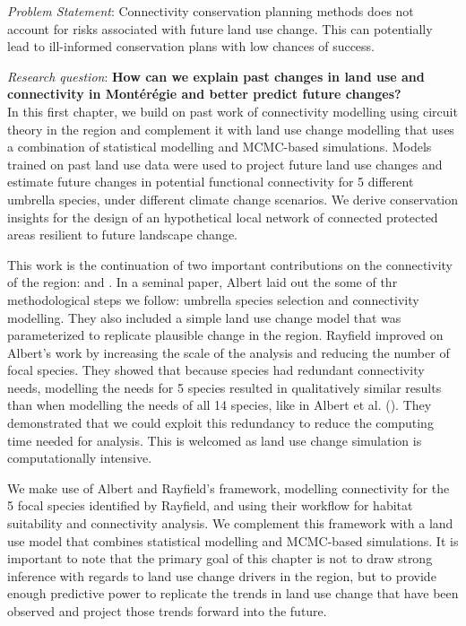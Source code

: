 \textit{Problem Statement}: Connectivity conservation planning methods does not account for risks associated with future land use change. This can potentially lead to ill-informed conservation plans with low chances of success.

\textit{Research question}: \textbf{How can we explain past changes in land use and connectivity in Montérégie and better predict future changes?}\\

In this first chapter, we build on past work of connectivity modelling using circuit theory in the region and complement it with land use change modelling that uses a combination of statistical modelling and MCMC-based simulations. Models trained on past land use data were used to project future land use changes and estimate future changes in potential functional connectivity for 5 different umbrella species, under different climate change scenarios. We derive conservation insights for the design of an hypothetical local network of connected protected areas resilient to future landscape change.

This work is the continuation of two important contributions on the connectivity of the region: \cite{albert_applying_2017} and \citep{rayfield_priorisation_2018}. In a seminal paper, Albert laid out the some of thr methodological steps we follow: umbrella species selection and connectivity modelling. They also included a simple land use change model that was parameterized to replicate plausible change in the region. Rayfield improved on Albert’s work by increasing the scale of the analysis and reducing the number of focal species. They showed that because species had redundant connectivity needs, modelling the needs for 5 species resulted in qualitatively similar results than when modelling the needs of all 14 species, like in Albert et al. (\citeyear{albert_applying_2017}). They demonstrated that we could exploit this redundancy to reduce the computing time needed for analysis. This is welcomed as land use change simulation is computationally intensive.

We make use of Albert and Rayfield’s framework, modelling connectivity for the 5 focal species identified by Rayfield, and using their workflow for habitat suitability and connectivity analysis. We complement this framework with a land use model that combines statistical modelling and MCMC-based simulations. It is important to note that the primary goal of this chapter is not to draw strong inference with regards to land use change drivers in the region, but to provide enough predictive power to replicate the trends in land use change that have been observed and project those trends forward into the future.

